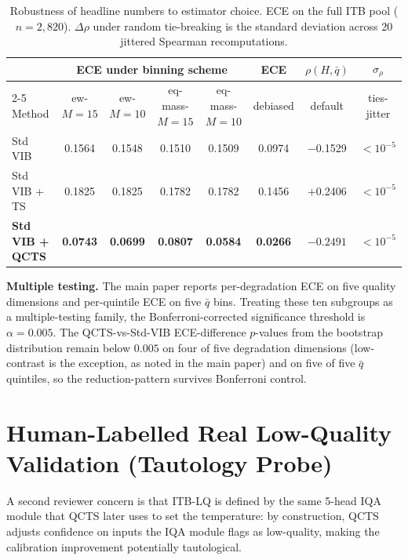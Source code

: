 \documentclass{bmvc2k}
\begin{document}
\begin{table}[h]
\centering
\caption{Robustness of headline numbers to estimator choice. ECE on the full ITB pool ($n{=}2{,}820$). $\Delta\rho$ under random tie-breaking is the standard deviation across 20 jittered Spearman recomputations.}
\label{tab:ece_robust}
\footnotesize
\begin{tabular}{lccccc c c}
\toprule
& \multicolumn{4}{c}{ECE under binning scheme} & ECE & $\rho(H,\bar q)$ & $\sigma_\rho$ \\
\cmidrule(lr){2-5}
Method & ew-$M{=}15$ & ew-$M{=}10$ & eq-mass-$M{=}15$ & eq-mass-$M{=}10$ & debiased & default & ties-jitter \\
\midrule
Std VIB        & 0.1564 & 0.1548 & 0.1510 & 0.1509 & 0.0974 & $-$0.1529 & $<10^{-5}$ \\
Std VIB + TS   & 0.1825 & 0.1825 & 0.1782 & 0.1782 & 0.1456 & $+$0.2406 & $<10^{-5}$ \\
\textbf{Std VIB + QCTS} & \textbf{0.0743} & \textbf{0.0699} & \textbf{0.0807} & \textbf{0.0584} & \textbf{0.0266} & $\mathbf{-0.2491}$ & $<10^{-5}$ \\
\bottomrule
\end{tabular}
\end{table}

\textbf{Multiple testing.}
The main paper reports per-degradation ECE on five quality dimensions and per-quintile ECE on five $\bar q$ bins. Treating these ten subgroups as a multiple-testing family, the Bonferroni-corrected significance threshold is $\alpha{=}0.005$. The QCTS-vs-Std-VIB ECE-difference $p$-values from the bootstrap distribution remain below $0.005$ on four of five degradation dimensions (low-contrast is the exception, as noted in the main paper) and on five of five $\bar q$ quintiles, so the reduction-pattern survives Bonferroni control.

\section{Human-Labelled Real Low-Quality Validation (Tautology Probe)}
\label{app:human_lq}

A second reviewer concern is that ITB-LQ is defined by the same 5-head IQA module that QCTS later uses to set the temperature: by construction, QCTS adjusts confidence on inputs the IQA module flags as low-quality, making the calibration improvement potentially tautological.
\end{document}

